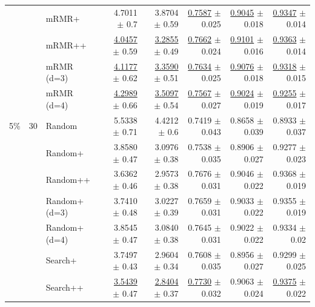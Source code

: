 \begin{longtable}{llp{}rrrrr}
 &  & mRMR+ & 4.7011 {\scriptsize $\pm$ 0.7} & 3.8704 {\scriptsize $\pm$ 0.59} & \underline{0.7587} {\scriptsize $\pm$ 0.025} & \underline{0.9045} {\scriptsize $\pm$ 0.018} & \underline{0.9347} {\scriptsize $\pm$ 0.014} \\
 &  & mRMR++ & \underline{4.0457} {\scriptsize $\pm$ 0.59} & \underline{3.2855} {\scriptsize $\pm$ 0.49} & \underline{0.7662} {\scriptsize $\pm$ 0.024} & \underline{0.9101} {\scriptsize $\pm$ 0.016} & \underline{0.9363} {\scriptsize $\pm$ 0.014} \\
 &  & mRMR (d=3) & \underline{4.1177} {\scriptsize $\pm$ 0.62} & \underline{3.3590} {\scriptsize $\pm$ 0.51} & \underline{0.7634} {\scriptsize $\pm$ 0.025} & \underline{0.9076} {\scriptsize $\pm$ 0.018} & \underline{0.9318} {\scriptsize $\pm$ 0.015} \\
 &  & mRMR (d=4) & \underline{4.2989} {\scriptsize $\pm$ 0.66} & \underline{3.5097} {\scriptsize $\pm$ 0.54} & \underline{0.7567} {\scriptsize $\pm$ 0.027} & \underline{0.9024} {\scriptsize $\pm$ 0.019} & \underline{0.9255} {\scriptsize $\pm$ 0.017} \\
\midrule
5\% & 30 & Random & 5.5338 {\scriptsize $\pm$ 0.71} & 4.4212 {\scriptsize $\pm$ 0.6} & 0.7419 {\scriptsize $\pm$ 0.043} & 0.8658 {\scriptsize $\pm$ 0.039} & 0.8933 {\scriptsize $\pm$ 0.037} \\
 &  & Random+ & 3.8580 {\scriptsize $\pm$ 0.47} & 3.0976 {\scriptsize $\pm$ 0.38} & 0.7538 {\scriptsize $\pm$ 0.035} & 0.8906 {\scriptsize $\pm$ 0.027} & 0.9277 {\scriptsize $\pm$ 0.023} \\
 &  & Random++ & 3.6362 {\scriptsize $\pm$ 0.46} & 2.9573 {\scriptsize $\pm$ 0.38} & 0.7676 {\scriptsize $\pm$ 0.031} & 0.9046 {\scriptsize $\pm$ 0.022} & 0.9368 {\scriptsize $\pm$ 0.019} \\
 &  & Random+ (d=3) & 3.7410 {\scriptsize $\pm$ 0.48} & 3.0227 {\scriptsize $\pm$ 0.39} & 0.7659 {\scriptsize $\pm$ 0.031} & 0.9033 {\scriptsize $\pm$ 0.022} & 0.9355 {\scriptsize $\pm$ 0.019} \\
 &  & Random+ (d=4) & 3.8545 {\scriptsize $\pm$ 0.47} & 3.0840 {\scriptsize $\pm$ 0.38} & 0.7645 {\scriptsize $\pm$ 0.031} & 0.9022 {\scriptsize $\pm$ 0.022} & 0.9334 {\scriptsize $\pm$ 0.02} \\
 &  & Search+ & 3.7497 {\scriptsize $\pm$ 0.43} & 2.9604 {\scriptsize $\pm$ 0.34} & 0.7608 {\scriptsize $\pm$ 0.035} & 0.8956 {\scriptsize $\pm$ 0.027} & 0.9299 {\scriptsize $\pm$ 0.025} \\
 &  & Search++ & \underline{3.5439} {\scriptsize $\pm$ 0.47} & \underline{2.8404} {\scriptsize $\pm$ 0.37} & \underline{0.7730} {\scriptsize $\pm$ 0.032} & 0.9063 {\scriptsize $\pm$ 0.024} & \underline{0.9375} {\scriptsize $\pm$ 0.022} \\

\end{longtable}

